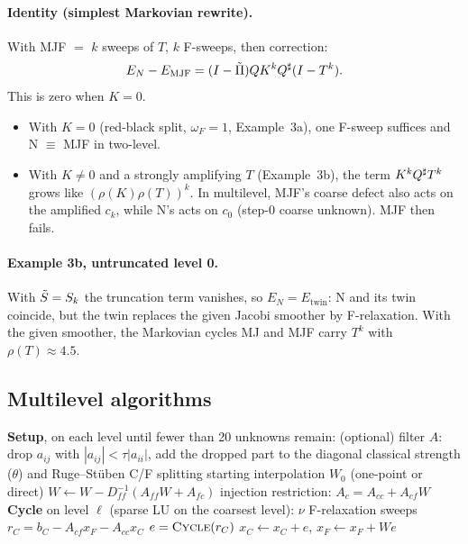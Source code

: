 \paragraph{Identity (simplest Markovian rewrite).} With MJF $=$ $k$ sweeps of $T$, $k$ F-sweeps, then correction:
\begin{equation}\label{eq:MJF}
  E_N-E_{\mathrm{MJF}}=(I-\tilde\Pi)QK^kQ^{\sharp}(I-T^k).
\end{equation}
This is zero when $K=0$.
\begin{itemize}
  \item With $K=0$ (red-black split, $\omega_F=1$, Example~3a), one F-sweep suffices and N $\equiv$ MJF in two-level.
  \item With $K\neq0$ and a strongly amplifying $T$ (Example~3b), the term $K^kQ^{\sharp} T^k$ grows like
    $(\rho(K)\rho(T))^k$. In multilevel, MJF's coarse defect also acts on the amplified $c_k$, while N's acts on
    $c_0$ (step-0 coarse unknown). MJF then fails.
\end{itemize}

\paragraph{Example 3b, untruncated level 0.} With $\tilde S=S_k$ the truncation term vanishes, so
$E_N=E_{\mathrm{twin}}$: N and its twin coincide, but the twin replaces the given Jacobi smoother by F-relaxation.
With the given smoother, the Markovian cycles MJ and MJF carry $T^k$ with $\rho(T)\approx4.5$.

\subsection{Multilevel algorithms}\label{sec:num-alg}

\begin{algorithm}[t]
\caption{(Example 1) Relaxation-built interpolation with injection restriction.}\label{alg:twin}
\begin{algorithmic}[1]
\Statex \textbf{Setup}, on each level until fewer than 20 unknowns remain:
\State (optional) filter $A$: drop $a_{ij}$ with $|a_{ij}|<\tau|a_{ii}|$, add the dropped part to the diagonal
\State classical strength ($\theta$) and Ruge--St\"uben C/F splitting
\State starting interpolation $W_0$ (one-point or direct)
 \State $W\leftarrow W-D_{ff}^{-1}(A_{ff}W+A_{fc})$ \EndFor
\State injection restriction: $A_c=A_{cc}+A_{cf}W$
\Statex \textbf{Cycle} on level $\ell$ (sparse LU on the coarsest level):
\State $\nu$ F-relaxation sweeps
\State $r_C=b_C-A_{cf}x_F-A_{cc}x_C$
\State $e=\textsc{Cycle}(r_C)$
\State $x_C\leftarrow x_C+e$, \quad $x_F\leftarrow x_F+We$
\end{algorithmic}
\end{algorithm}

